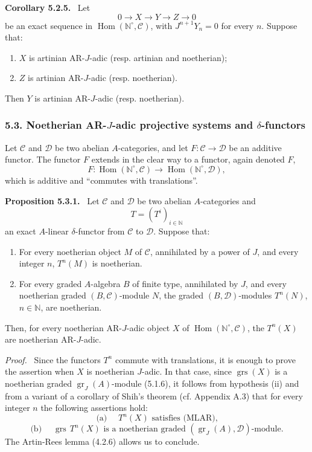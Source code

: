 \documentclass[11pt]{article}
\newenvironment{statement}[1]{\par\medskip\noindent\textbf{#1.}\ }{\par\medskip}
\newenvironment{prooftext}[1][Proof]{\par\noindent\emph{#1.}\ }{\par\medskip}
\DeclareMathOperator{\Hom}{Hom}
\providecommand{\gr}{\operatorname{gr}}
\providecommand{\Hom}{\operatorname{Hom}}
\providecommand{\gr}{\operatorname{gr}}
\providecommand{\gr}{\operatorname{gr}}
\providecommand{\grs}{\operatorname{grs}}
\providecommand{\Hom}{\operatorname{Hom}}
\begin{document}
\begin{statement}{Corollary 5.2.5}
Let
\[
0\longrightarrow X\longrightarrow Y\longrightarrow Z\longrightarrow0
\]
be an exact sequence in \(\Hom(\mathbb N^\circ,\mathcal C)\), with \(J^{n+1}Y_n=0\) for every \(n\). Suppose that:
\begin{enumerate}[label=\textup{(\roman*)}]
\item \(X\) is artinian AR-\(J\)-adic (resp. artinian and noetherian);
\item \(Z\) is artinian AR-\(J\)-adic (resp. noetherian).
\end{enumerate}
Then \(Y\) is artinian AR-\(J\)-adic (resp. noetherian).
\end{statement}

\subsubsection*{5.3. Noetherian AR-\(J\)-adic projective systems and \(\delta\)-functors}

Let \(\mathcal C\) and \(\mathcal D\) be two abelian \(A\)-categories, and let \(F:\mathcal C\to\mathcal D\) be an additive functor. The functor \(F\) extends in the clear way to a functor, again denoted \(F\),
\[
F:\Hom(\mathbb N^\circ,\mathcal C)\longrightarrow\Hom(\mathbb N^\circ,\mathcal D),
\]
which is additive and “commutes with translations”.

\begin{statement}{Proposition 5.3.1}
Let \(\mathcal C\) and \(\mathcal D\) be two abelian \(A\)-categories and
\[
T=(T^i)_{i\in\mathbb N}
\]
an exact \(A\)-linear \(\delta\)-functor from \(\mathcal C\) to \(\mathcal D\). Suppose that:
\begin{enumerate}[label=\textup{(\roman*)}]
\item For every noetherian object \(M\) of \(\mathcal C\), annihilated by a power of \(J\), and every integer \(n\), \(T^n(M)\) is noetherian.
\item For every graded \(A\)-algebra \(B\) of finite type, annihilated by \(J\), and every noetherian graded \((B,\mathcal C)\)-module \(N\), the graded \((B,\mathcal D)\)-modules \(T^n(N)\), \(n\in\mathbb N\), are noetherian.
\end{enumerate}
Then, for every noetherian AR-\(J\)-adic object \(X\) of \(\Hom(\mathbb N^\circ,\mathcal C)\), the \(T^n(X)\) are noetherian AR-\(J\)-adic.
\end{statement}

\begin{prooftext}
Since the functors \(T^n\) commute with translations, it is enough to prove the assertion when \(X\) is noetherian \(J\)-adic. In that case, since \(\grs(X)\) is a noetherian graded \(\gr_J(A)\)-module (5.1.6), it follows from hypothesis (ii) and from a variant of a corollary of Shih's theorem (cf. Appendix A.3) that for every integer \(n\) the following assertions hold:
\[
\text{(a) }\quad T^n(X)\text{ satisfies (MLAR),}
\]
\[
\text{(b) }\quad \grs\,T^n(X)\text{ is a noetherian graded }(\gr_J(A),\mathcal D)\text{-module.}
\]
The Artin-Rees lemma (4.2.6) allows us to conclude.
\end{prooftext}
\end{document}
